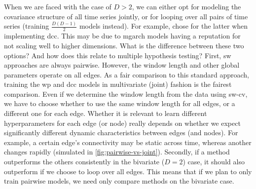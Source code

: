 When we are faced with the case of $D > 2$, we can either opt for modeling the covariance structure of all time series jointly, or for looping over all pairs of time series (training $\frac{D (D - 1)}{2}$ models instead).
%
For example, \textcite{Choe2017, Hakimdavoodi2020} chose for the latter when implementing \gls{dcc}.
This may be due to \gls{mgarch} models having a reputation for not scaling well to higher dimensions.
%
What is the difference between these two options?
And how does this relate to multiple hypothesis testing?
First, \gls{sw} approaches are always pairwise.
However, the window length and other global parameters operate on all edges.
As a fair comparison to this standard approach, training the \gls{wp} and \gls{dcc} models in multivariate (joint) fashion is the fairest comparison.
Even if we determine the window length from the data using \gls{sw-cv}, we have to choose whether to use the same window length for all edges, or a different one for each edge.
%
Whether it is relevant to learn different hyperparameters for each edge (or node) really depends on whether we expect significantly different dynamic characteristics between edges (and nodes).
For example, a certain edge's connectivity may be static across time, whereas another changes rapidly (simulated in \cref{fig:pairwise-vs-joint}).
%
Secondly, if a method outperforms the others consistently in the bivariate ($D = 2$) case, it should also outperform if we choose to loop over all edges.
This means that if we plan to only train pairwise models, we need only compare methods on the bivariate case.


